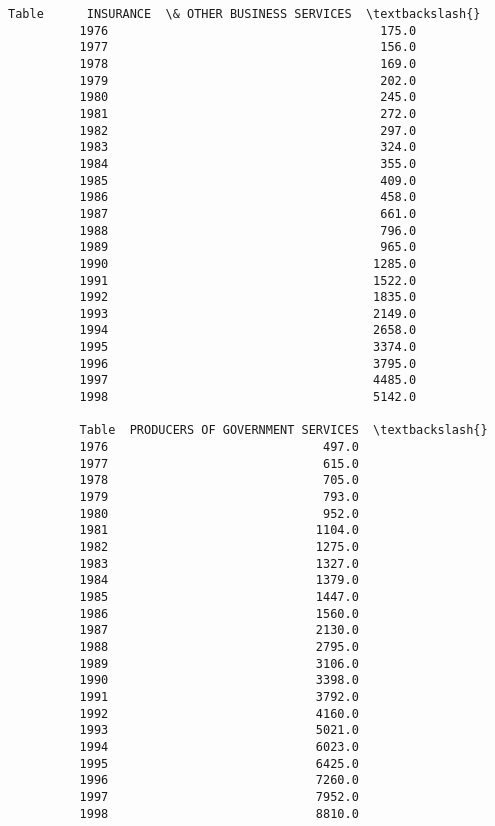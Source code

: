 \documentclass[11pt]{article}
\begin{document}
\begin{Verbatim}[commandchars=\\\{\}]
          Table      INSURANCE  \& OTHER BUSINESS SERVICES  \textbackslash{}
          1976                                      175.0   
          1977                                      156.0   
          1978                                      169.0   
          1979                                      202.0   
          1980                                      245.0   
          1981                                      272.0   
          1982                                      297.0   
          1983                                      324.0   
          1984                                      355.0   
          1985                                      409.0   
          1986                                      458.0   
          1987                                      661.0   
          1988                                      796.0   
          1989                                      965.0   
          1990                                     1285.0   
          1991                                     1522.0   
          1992                                     1835.0   
          1993                                     2149.0   
          1994                                     2658.0   
          1995                                     3374.0   
          1996                                     3795.0   
          1997                                     4485.0   
          1998                                     5142.0   
          
          Table  PRODUCERS OF GOVERNMENT SERVICES  \textbackslash{}
          1976                              497.0   
          1977                              615.0   
          1978                              705.0   
          1979                              793.0   
          1980                              952.0   
          1981                             1104.0   
          1982                             1275.0   
          1983                             1327.0   
          1984                             1379.0   
          1985                             1447.0   
          1986                             1560.0   
          1987                             2130.0   
          1988                             2795.0   
          1989                             3106.0   
          1990                             3398.0   
          1991                             3792.0   
          1992                             4160.0   
          1993                             5021.0   
          1994                             6023.0   
          1995                             6425.0   
          1996                             7260.0   
          1997                             7952.0   
          1998                             8810.0   
          

\end{Verbatim}
\end{document}

